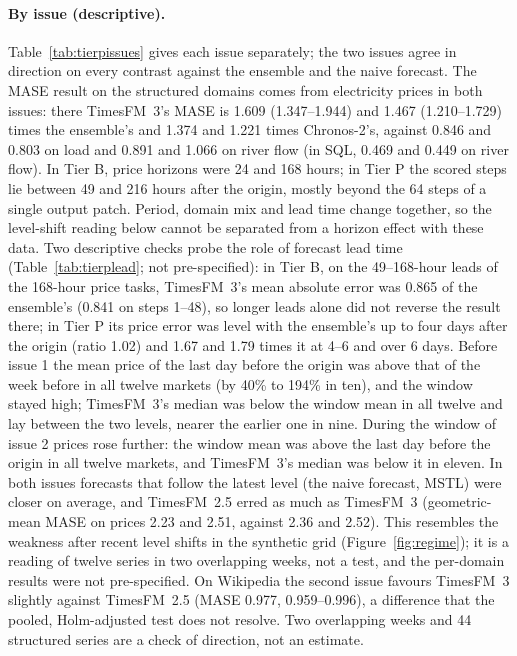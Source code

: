 \paragraph{By issue (descriptive).} Table~\ref{tab:tierpissues} gives each issue separately; the two issues agree in direction on
every contrast against the ensemble and the naive forecast. The MASE result on the structured domains comes from electricity
prices in both issues: there TimesFM~3's MASE is 1.609 (1.347--1.944) and 1.467 (1.210--1.729) times the ensemble's and 1.374 and
1.221 times Chronos-2's, against 0.846 and 0.803 on load and 0.891 and 1.066 on river flow (in SQL, 0.469 and 0.449 on river flow).
In Tier B, price horizons were 24 and 168 hours; in Tier P the scored steps lie between 49 and 216 hours after the origin, mostly
beyond the 64 steps of a single output patch. Period, domain mix and lead time change together, so the level-shift reading below
cannot be separated from a horizon effect with these data. Two descriptive checks probe the role of forecast lead time (Table~\ref{tab:tierplead};
not pre-specified): in Tier B, on the 49--168-hour leads of the 168-hour price tasks, TimesFM~3's mean absolute error was 0.865 of
the ensemble's (0.841 on steps 1--48), so longer leads alone did not reverse the result there; in Tier P its price error was level
with the ensemble's up to four days after the origin (ratio 1.02) and 1.67 and 1.79 times it at 4--6 and over 6 days. Before issue 1 the mean price of the last day before the origin was above that of the week before in all twelve
markets (by 40\% to 194\% in ten), and the window stayed high; TimesFM~3's median was below the window mean in all twelve and lay
between the two levels, nearer the earlier one in nine. During the window of issue 2 prices rose further: the window mean was above the last day before
the origin in all twelve markets, and TimesFM~3's median was below it in eleven. In both issues forecasts that follow the latest
level (the naive forecast, MSTL) were closer on average, and TimesFM~2.5 erred as much as TimesFM~3 (geometric-mean MASE on
prices 2.23 and 2.51, against 2.36 and 2.52). This resembles the weakness after recent level shifts in the synthetic
grid (Figure~\ref{fig:regime}); it is a reading of twelve series in two overlapping weeks, not a test, and the per-domain results
were not pre-specified. On Wikipedia the second issue favours TimesFM~3 slightly against TimesFM~2.5 (MASE 0.977, 0.959--0.996), a
difference that the pooled, Holm-adjusted test does not resolve. Two overlapping weeks and 44 structured series are a check of
direction, not an estimate.

